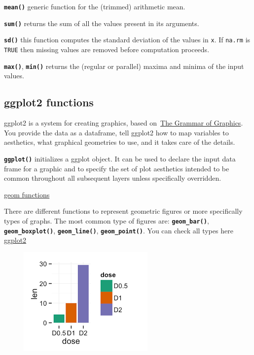 \documentclass[
  letterpaper,
  DIV=11,
  numbers=noendperiod]{scrartcl}
\begin{document}
\textbf{\texttt{mean()}} generic function for the (trimmed) arithmetic
mean.

\textbf{\texttt{sum()}} returns the sum of all the values present in its
arguments.

\textbf{\texttt{sd()}} this function computes the standard deviation of
the values in \texttt{x}. If \texttt{na.rm} is \texttt{TRUE} then
missing values are removed before computation proceeds.

\textbf{\texttt{max()}}, \textbf{\texttt{min()}} returns the (regular or
parallel) maxima and minima of the input values.

\hypertarget{ggplot2-functions}{%
\subsection{ggplot2 functions}\label{ggplot2-functions}}

ggplot2 is a system for creating graphics, based
on~\href{https://www.amazon.com/Grammar-Graphics-Statistics-Computing/dp/0387245448/ref=as_li_ss_tl}{The
Grammar of Graphics}. You provide the data as a dataframe, tell ggplot2
how to map variables to aesthetics, what graphical geometries to use,
and it takes care of the details.

\textbf{\texttt{ggplot()}} initializes a ggplot object. It can be used
to declare the input data frame for a graphic and to specify the set of
plot aesthetics intended to be common throughout all subsequent layers
unless specifically overridden.

\uline{geom functions}

There are different functions to represent geometric figures or more
specifically types of graphs. The most common type of figures are:
\textbf{\texttt{geom\_bar()}}, \textbf{\texttt{geom\_boxplot()}},
\textbf{\texttt{geom\_line()}}, \textbf{\texttt{geom\_point()}}. You can
check all types here \href{https://ggplot2.tidyverse.org}{ggplot2}

\begin{figure}[h]

{\centering \includegraphics{barplot.png}

}

\end{figure}
\end{document}
